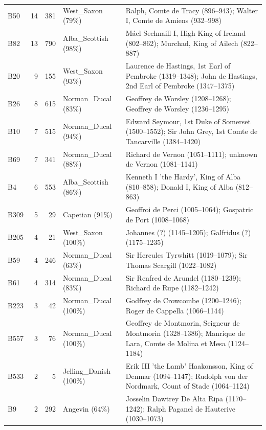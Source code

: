 \documentclass[12pt]{article}
\theoremstyle{definition}
\theoremstyle{remark}
\begin{document}
\begin{longtable}{lrrp{2.6cm}p{5.9cm}}
B50 & 14 & 381 & West\_Saxon (79\%) & {\footnotesize Ralph, Comte de Tracy (896--943); Walter I, Comte de Amiens (932--998)} \\
B82 & 13 & 790 & Alba\_Scottish (98\%) & {\footnotesize Máel Sechnaill I, High King of Ireland (802--862); Murchad, King of Ailech (822--887)} \\
B20 & 9 & 155 & West\_Saxon (93\%) & {\footnotesize Laurence de Hastings, 1st Earl of Pembroke (1319--1348); John de Hastings, 2nd Earl of Pembroke (1347--1375)} \\
B26 & 8 & 615 & Norman\_Ducal (83\%) & {\footnotesize Geoffrey de Worsley (1208--1268); Geoffrey de Worsley (1236--1295)} \\
B10 & 7 & 515 & Norman\_Ducal (94\%) & {\footnotesize Edward Seymour, 1st Duke of Somerset (1500--1552); Sir John Grey, 1st Comte de Tancarville (1384--1420)} \\
B69 & 7 & 341 & Norman\_Ducal (88\%) & {\footnotesize Richard de Vernon (1051--1111); unknown de Vernon (1081--1141)} \\
B4 & 6 & 553 & Alba\_Scottish (86\%) & {\footnotesize Kenneth I 'the Hardy', King of Alba (810--858); Donald I, King of Alba (812--863)} \\
B309 & 5 & 29 & Capetian (91\%) & {\footnotesize Geoffroi de Perci (1005--1064); Gospatric de Port (1008--1068)} \\
B205 & 4 & 21 & West\_Saxon (100\%) & {\footnotesize Johannes (?) (1145--1205); Galfridus (?) (1175--1235)} \\
B59 & 4 & 246 & Norman\_Ducal (63\%) & {\footnotesize Sir Hercules Tyrwhitt (1019--1079); Sir Thomas Scargill (1022--1082)} \\
B61 & 4 & 314 & Norman\_Ducal (83\%) & {\footnotesize Sir Renfred de Arundel (1180--1239); Richard de Rupe (1182--1242)} \\
B223 & 3 & 42 & Norman\_Ducal (100\%) & {\footnotesize Godfrey de Crowcombe (1200--1246); Roger de Cappella (1066--1144)} \\
B557 & 3 & 76 & Norman\_Ducal (100\%) & {\footnotesize Geoffrey de Montmorin, Seigneur de Montmorin (1328--1386); Manrique de Lara, Comte de Molina et Mesa (1124--1184)} \\
B533 & 2 & 5 & Jelling\_Danish (100\%) & {\footnotesize Erik III 'the Lamb' Haakonsson, King of Denmar (1094--1147); Rudolph von der Nordmark, Count of Stade (1064--1124)} \\
B9 & 2 & 292 & Angevin (64\%) & {\footnotesize Josselin Dawtrey De Alta Ripa (1170--1242); Ralph Paganel de Hauterive (1030--1073)} \\

\end{longtable}
\end{document}
